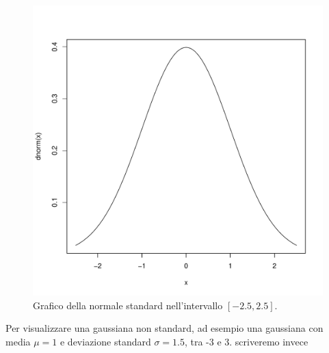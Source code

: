\documentclass[onecolumn,12pt]{book}\usepackage[]{graphicx}\usepackage[]{color}
\makeatletter
\def\maxwidth{ %
  \ifdim\Gin@nat@width>\linewidth
    \linewidth
  \else
    \Gin@nat@width
  \fi
}
\newenvironment{knitrout}{}{} %
\makeatother
\begin{document}
\begin{figure}[htbp]
\begin{center}
\begin{knitrout}
\color{fgcolor}
\includegraphics[width=\maxwidth]{figure/unnamed-chunk-138-1} 

\end{knitrout}
\caption{ Grafico della normale standard nell'intervallo $[-2.5,2.5]$. }
\label{fig:normalesta}
\end{center}
\end{figure}
Per  visualizzare una gaussiana non standard, ad esempio una gaussiana con media $\mu=1$ e  deviazione standard $\sigma=1.5$, tra -3 e 3. scriveremo invece
\end{document}
